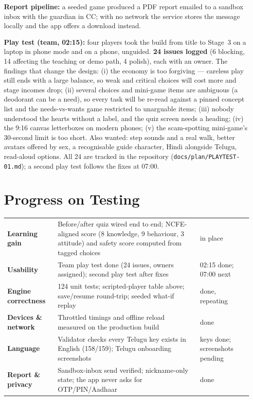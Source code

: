 \documentclass[10pt,a4paper]{article}
\begin{document}
\textbf{Report pipeline:} a seeded game produced a PDF report emailed to a sandbox inbox with the guardian in CC; with no network the service stores the message locally and the app offers a download instead.

\textbf{Play test (team, 02:15):} four players took the build from title to Stage~3 on a laptop in phone mode and on a phone, unguided. \textbf{24 issues logged} (6 blocking, 14 affecting the teaching or demo path, 4 polish), each with an owner. The findings that change the design: (i) the economy is too forgiving --- careless play still ends with a large balance, so weak and critical choices will cost more and stage incomes drop; (ii) several choices and mini-game items are ambiguous (a deodorant can be a need), so every task will be re-read against a pinned concept list and the needs-vs-wants game restricted to unarguable items; (iii) nobody understood the hearts without a label, and the quiz screen needs a heading; (iv) the 9:16 canvas letterboxes on modern phones; (v) the scam-spotting mini-game's 30-second limit is too short. Also wanted: step sounds and a real walk, better avatars offered by sex, a recognisable guide character, Hindi alongside Telugu, read-aloud options. All 24 are tracked in the repository (\texttt{docs/plan/PLAYTEST-01.md}); a second play test follows the fixes at 07:00.

\section{Progress on Testing}
\begin{tabularx}{\textwidth}{@{}>{\bfseries}p{3.0cm}Xp{2.3cm}@{}}
\toprule
Learning gain & Before/after quiz wired end to end; NCFE-aligned score (8 knowledge, 9 behaviour, 3 attitude) and safety score computed from tagged choices & in place \\
Usability & Team play test done (24 issues, owners assigned); second play test after fixes & 02:15 done; 07:00 next \\
Engine correctness & 124 unit tests; scripted-player table above; save/resume round-trip; seeded what-if replay & done, repeating \\
Devices \& network & Throttled timings and offline reload measured on the production build & done \\
Language & Validator checks every Telugu key exists in English (158/159); Telugu onboarding screenshots & keys done; screenshots pending \\
Report \& privacy & Sandbox-inbox send verified; nickname-only state; the app never asks for OTP/PIN/Aadhaar & done \\
\bottomrule
\end{tabularx}
\end{document}
